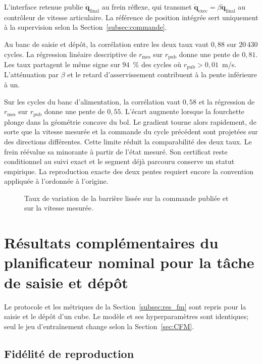 L'interface retenue publie $\dot{\mathbf q}_{\mathrm{final}}$ au frein réflexe, qui transmet $\dot{\mathbf q}_{\mathrm{exec}}=\beta\dot{\mathbf q}_{\mathrm{final}}$ au contrôleur de vitesse articulaire. La référence de position intégrée sert uniquement à la supervision selon la Section~\ref{subsec:commande}.

Au banc de saisie et dépôt, la corrélation entre les deux taux vaut $0{,}88$ sur $20\,430$ cycles. La régression linéaire descriptive de $r_{\mathrm{mes}}$ sur $r_{\mathrm{pub}}$ donne une pente de $0{,}81$. Les taux partagent le même signe sur $94$~\% des cycles où $r_{\mathrm{pub}}>0{,}01$~m/s. L'atténuation par $\beta$ et le retard d'asservissement contribuent à la pente inférieure à un.

Sur les cycles du banc d'alimentation, la corrélation vaut $0{,}58$ et la régression de $r_{\mathrm{mes}}$ sur $r_{\mathrm{pub}}$ donne une pente de $0{,}55$. L'écart augmente lorsque la fourchette plonge dans la géométrie concave du bol. Le gradient tourne alors rapidement, de sorte que la vitesse mesurée et la commande du cycle précédent sont projetées sur des directions différentes. Cette limite réduit la comparabilité des deux taux. Le frein réévalue sa minorante à partir de l'état mesuré. Son certificat reste conditionnel au suivi exact et le segment déjà parcouru conserve un statut empirique. La reproduction exacte des deux pentes requiert encore la convention appliquée à l'ordonnée à l'origine.

\begin{figure}[htpb]
    \centering
    
    \caption{Taux de variation de la barrière lissée sur la commande publiée et sur la vitesse mesurée.}\label{fig:hdot_interface}
\end{figure}

\section*{Résultats complémentaires du planificateur nominal pour la tâche de saisie et dépôt}

Le protocole et les métriques de la Section~\ref{subsec:res_fm} sont repris pour la saisie et le dépôt d'un cube. Le modèle et ses hyperparamètres sont identiques; seul le jeu d'entraînement change selon la Section~\ref{sec:CFM}.

\subsection*{Fidélité de reproduction}

